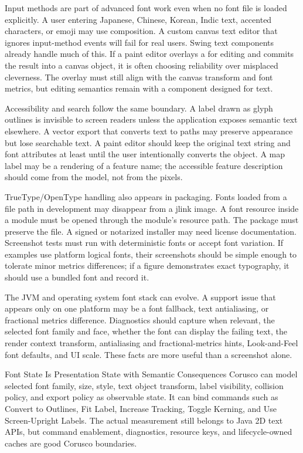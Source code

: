 Input methods are part of advanced font work even when no font file is loaded explicitly. A user entering Japanese, Chinese, Korean, Indic text, accented characters, or emoji may use composition. A custom canvas text editor that ignores input-method events will fail for real users. Swing text components already handle much of this. If a paint editor overlays a  for editing and commits the result into a canvas object, it is often choosing reliability over misplaced cleverness. The overlay must still align with the canvas transform and font metrics, but editing semantics remain with a component designed for text.

Accessibility and search follow the same boundary. A label drawn as glyph outlines is invisible to screen readers unless the application exposes semantic text elsewhere. A vector export that converts text to paths may preserve appearance but lose searchable text. A paint editor should keep the original text string and font attributes at least until the user intentionally converts the object. A map label may be a rendering of a feature name; the accessible feature description should come from the model, not from the pixels.

TrueType/OpenType handling also appears in packaging. Fonts loaded from a file path in development may disappear from a jlink image. A font resource inside a module must be opened through the module's resource path. The package must preserve the file. A signed or notarized installer may need license documentation. Screenshot tests must run with deterministic fonts or accept font variation. If examples use platform logical fonts, their screenshots should be simple enough to tolerate minor metrics differences; if a figure demonstrates exact typography, it should use a bundled font and record it.

The JVM and operating system font stack can evolve. A support issue that appears only on one platform may be a font fallback, text antialiasing, or fractional metrics difference. Diagnostics should capture  when relevant, the selected font family and face, whether the font can display the failing text, the render context transform, antialiasing and fractional-metrics hints, Look-and-Feel font defaults, and UI scale. These facts are more useful than a screenshot alone.

\begin{coruscobox}{Font State Is Presentation State with Semantic Consequences}
Corusco can model selected font family, size, style, text object transform, label visibility, collision policy, and export policy as observable state. It can bind commands such as Convert to Outlines, Fit Label, Increase Tracking, Toggle Kerning, and Use Screen-Upright Labels. The actual measurement still belongs to Java 2D text APIs, but command enablement, diagnostics, resource keys, and lifecycle-owned caches are good Corusco boundaries.
\end{coruscobox}

